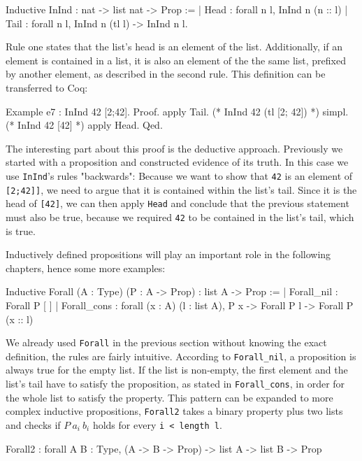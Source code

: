 \documentclass[paper = a4, fleqn, abstract=on, twoside]{scrreprt}
\newcommand{\coqinline}[1]{\texttt{#1}}
\begin{document}
\label{In}
\begin{coqcode}
Inductive InInd : nat -> list nat -> Prop :=
| Head : forall n l, InInd n (n :: l)
| Tail : forall n l, InInd n (tl l) -> InInd n l.
\end{coqcode} 
Rule one states that the list's head is an element of the list. Additionally, if an element is contained in a list, it is also an element of the the same list, prefixed by another element, as described in the second rule. This definition can be transferred to Coq:
\begin{coqcode}
Example e7 : InInd 42 [2;42].
Proof. 
  apply Tail.  (* InInd 42 (tl [2; 42]) *)
  simpl.       (* InInd 42 [42] *)
  apply Head.
Qed.           
\end{coqcode}
The interesting part about this proof is the deductive approach. Previously we started with a proposition and constructed evidence of its truth. In this case we use \coqinline{InInd}'s rules "backwards": Because we want to show that \coqinline{42} is an element of \coqinline{[2;42]]}, we need to argue that it is contained within the list's tail. Since it is the head of \coqinline{[42]}, we can then apply \coqinline{Head} and conclude that the previous statement must also be true, because we required \coqinline{42} to be contained in the list's tail, which is true.
\par
Inductively defined propositions will play an important role in the following chapters, hence some more examples:
\begin{coqcode}
Inductive Forall (A : Type) (P : A -> Prop) : list A -> Prop :=
| Forall_nil : Forall P [ ]
| Forall_cons : forall (x : A) (l : list A), P x -> Forall P l -> Forall P (x :: l)
\end{coqcode}
We already used \coqinline{Forall} in the previous section without knowing the exact definition, the rules are fairly intuitive. According to \coqinline{Forall_nil}, a proposition is always true for the empty list. If the list is non-empty, the first element and the list's tail have to satisfy the proposition, as stated in \coqinline{Forall_cons}, in order for the whole list to satisfy the property. This pattern can be expanded to more complex inductive propositions, \coqinline{Forall2} takes a binary property plus two lists and checks if $P ~ a_{i} ~ b_{i}$ holds for every \coqinline{i < length l}.
\begin{coqcode}
Forall2 : forall A B : Type, (A -> B -> Prop) -> list A -> list B -> Prop
\end{coqcode}
\end{document}
